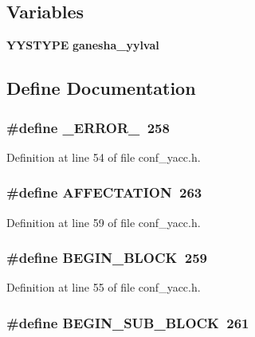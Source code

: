 \subsection*{Variables}
\begin{CompactItemize}
\item 
{\bf YYSTYPE} {\bf ganesha\_\-yylval}
\end{CompactItemize}


\subsection{Define Documentation}
\subsubsection[{\_\-ERROR\_\-}]{\setlength{\rightskip}{0pt plus 5cm}\#define \_\-ERROR\_\-~258}\label{conf__yacc_8h_4d178ec5f52534c3fcc7b775e0d45dca}




Definition at line 54 of file conf\_\-yacc.h.
\subsubsection[{AFFECTATION}]{\setlength{\rightskip}{0pt plus 5cm}\#define AFFECTATION~263}\label{conf__yacc_8h_022df7a30fcaef01eebfb88950340e5f}




Definition at line 59 of file conf\_\-yacc.h.
\subsubsection[{BEGIN\_\-BLOCK}]{\setlength{\rightskip}{0pt plus 5cm}\#define BEGIN\_\-BLOCK~259}\label{conf__yacc_8h_0cfed3166e84c638e5e9fa1699a80ef9}




Definition at line 55 of file conf\_\-yacc.h.
\subsubsection[{BEGIN\_\-SUB\_\-BLOCK}]{\setlength{\rightskip}{0pt plus 5cm}\#define BEGIN\_\-SUB\_\-BLOCK~261}\label{conf__yacc_8h_58b355915dd539386d8e0b3b7a01ecf5}




